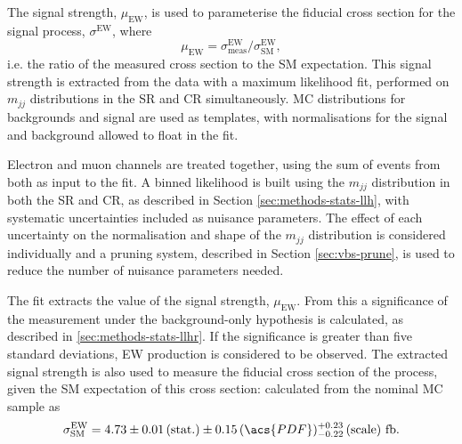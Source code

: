 
The signal strength, $\mu_\text{EW}$, is used to parameterise the fiducial
cross section for the signal process, $\sigma^\text{EW}$, where
%
\begin{equation}
  \mu_\text{EW} = \sigma^\text{EW}_\text{meas} / \sigma^\text{EW}_\text{SM},
  \label{eqn:vbs-fit-mu}
\end{equation}
%
i.e. the ratio of the measured cross section to the \ac{SM} expectation. This
signal strength is extracted from the data with a maximum likelihood fit,
performed on $m_{jj}$ distributions in the \ac{SR} and \ac{CR} simultaneously.
\ac{MC} distributions for backgrounds and signal are used as templates, with
normalisations for the signal and \QCDZy background allowed to float in
the fit.

Electron and muon channels are treated together, using the sum of events from
both as input to the fit. A binned likelihood is built using
the $m_{jj}$ distribution in both the \ac{SR} and \ac{CR}, as described in
Section \ref{sec:methods-stats-llh}, with systematic uncertainties included as
nuisance parameters.
The effect of each uncertainty on the normalisation and shape of the
$m_{jj}$ distribution is considered individually and a pruning system, described
in Section \ref{sec:vbs-prune}, is used to reduce the number of nuisance
parameters needed.

The fit extracts the value of the signal strength, $\mu_\text{EW}$.
From this a significance of the measurement under the background-only hypothesis
is calculated, as described in \ref{sec:methods-stats-llhr}.
If the significance is greater than five standard deviations, \ac{EW} \Zy
production is considered to be observed. The extracted signal strength is
also used to measure the fiducial cross section of the process,
given the \ac{SM} expectation of this cross section: calculated from the
nominal \ac{MC} sample as
%
\begin{equation*}
  \sigma^\text{EW}_\text{SM} = 4.73
  \pm 0.01 \, (\text{stat.})
  \pm 0.15 \, (\acs{PDF})
  ^{+0.23} _{-0.22} \, (\text{scale})
  ~\text{fb}.
\end{equation*}


